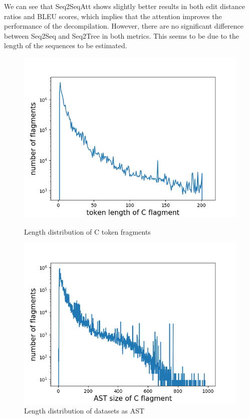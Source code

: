 \documentclass[senior,final,11pt]{iscs-thesis}
\begin{document}
We can see that Seq2SeqAtt shows slightly better results in both edit distance ratios and BLEU scores,
 which implies that the attention improves the performance of the decompilation.
However, there are no significant difference between Seq2Seq and Seq2Tree in both metrics.
This seems to be due to the length of the sequences to be estimated.

\begin{figure}[]
	\includegraphics[width=12cm]{c_lens.png}
	\caption{Length distribution of C token fragments}
	\label{fig:csizes}
	\includegraphics[width=12cm]{ast_lens.png}
	\caption{Length distribution of datasets as AST}
	\label{fig:astsizes}
\end{figure}
\end{document}
